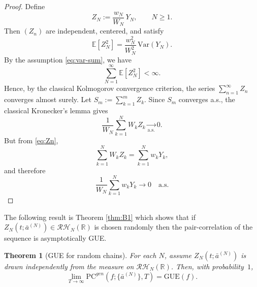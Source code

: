 \documentclass[12pt,reqno]{amsart}
\theoremstyle{plain}
\newtheorem{theorem}{Theorem}[section]
\theoremstyle{definition}
\theoremstyle{remark}
\begin{document}
\begin{proof}
Define
\begin{equation}\label{eq:Zn}
Z_N := \frac{w_N}{W_N}\,Y_N , \qquad N \ge1 .
\end{equation}
Then $(Z_n)$ are independent, centered, and satisfy
\begin{equation}
\mathbb{E}[Z_N^2] = \frac{w_N^2}{W_N^2}\,\mathrm{Var}(Y_N).
\end{equation}
By the assumption \eqref{eq:var-sum}, we have
\begin{equation}
\sum_{N=1}^\infty \mathbb{E}[Z_N^2] < \infty.
\end{equation}
Hence, by the classical Kolmogorov convergence criterion,
the series $\sum_{n=1}^\infty Z_n$ converges almost surely. Let $S_m := \sum_{k=1}^m Z_k$.  
Since $S_m$ converges a.s., the classical Kronecker's lemma \cite{ChowTeicher} gives
\begin{equation}
\frac{1}{W_N}\sum_{k=1}^N W_k Z_k \xrightarrow[\mathrm{a.s.}]{} 0 .
\end{equation}
But from \eqref{eq:Zn},
\begin{equation}
\sum_{k=1}^N W_k Z_k = \sum_{k=1}^N w_k Y_k,
\end{equation}
and therefore
\begin{equation}
\frac{1}{W_N}\sum_{k=1}^N w_k Y_k \to 0 \quad \text{a.s.}
\end{equation}
\end{proof}


The following result is Theorem \ref{thm:B1} which shows that if $Z_N(t; \bar a^{(N)}) \in \mathcal{RH}_N(\mathbb{R})$ is chosen randomly then the pair-correlation of the sequence is asymptotically GUE. 

\begin{theorem}[GUE for random chains]
\label{prop:random-chain-GUE}
For each $N$, assume $Z_N(t ; \bar a^{(N)})$ is drawn independently from the measure on $\mathcal{RH}_N(\mathbb{R})$. 
Then, with probability~$1$,
\begin{equation}
\lim_{T\to\infty}\mathrm{PC}^{gen}(f; 
\{ \bar a^{(N)} \}, T)
=\mathrm{GUE}(f).
\end{equation}
\end{theorem}
\end{document}
